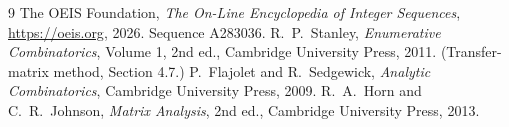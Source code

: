 \documentclass[11pt,a4paper]{article}
\theoremstyle{plain}
\theoremstyle{definition}
\begin{document}
\begin{thebibliography}{9}
 The OEIS Foundation, \emph{The On-Line Encyclopedia of Integer
Sequences}, \url{https://oeis.org}, 2026. Sequence A283036.
 R.~P.~Stanley, \emph{Enumerative Combinatorics}, Volume 1, 2nd ed.,
Cambridge University Press, 2011. (Transfer-matrix method, Section 4.7.)
 P.~Flajolet and R.~Sedgewick, \emph{Analytic Combinatorics}, Cambridge
University Press, 2009.
 R.~A.~Horn and C.~R.~Johnson, \emph{Matrix Analysis}, 2nd ed., Cambridge
University Press, 2013.
\end{thebibliography}
\end{document}
